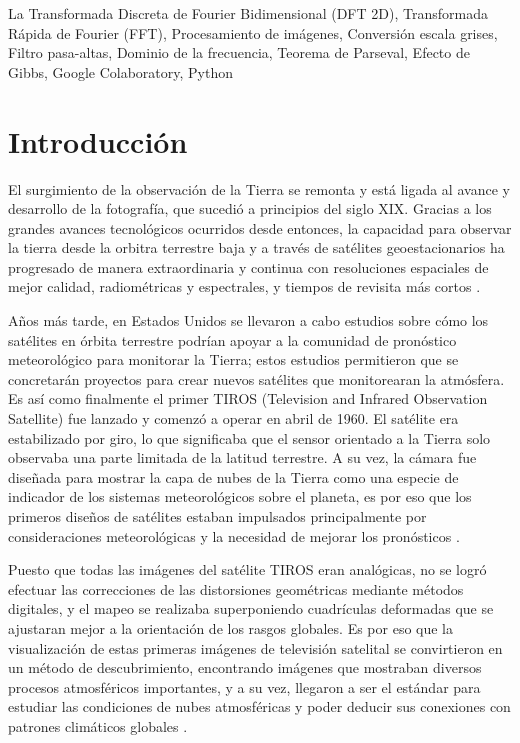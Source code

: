 \documentclass[conference]{IEEEtran}
\begin{document}
\vspace{0.5em}
\begin{IEEEkeywords}
La Transformada Discreta de Fourier Bidimensional
(DFT 2D), Transformada Rápida de Fourier (FFT), Procesamiento de imágenes, Conversión escala grises, Filtro pasa-altas, Dominio de la frecuencia, Teorema de Parseval, Efecto de Gibbs, Google Colaboratory, Python
\end{IEEEkeywords}

\section{Introducción}
El surgimiento de la observación de la Tierra se remonta y está ligada al avance y desarrollo de la fotografía, que sucedió a principios del siglo XIX. Gracias a los grandes avances tecnológicos ocurridos desde entonces, la capacidad para observar la tierra desde la orbitra terrestre baja y a través de satélites geoestacionarios ha progresado de manera extraordinaria y continua con resoluciones espaciales de mejor calidad, radiométricas y espectrales, y tiempos de revisita más cortos \cite{emery2017}.

Años más tarde, en Estados Unidos se llevaron a cabo estudios sobre cómo los satélites en órbita terrestre podrían apoyar a la comunidad de pronóstico meteorológico para monitorar la Tierra; estos estudios permitieron que se concretarán proyectos para crear nuevos satélites que monitorearan la atmósfera. Es así como finalmente el primer TIROS (Television and Infrared Observation Satellite) fue lanzado y comenzó a operar en abril de 1960. El satélite era estabilizado por giro, lo que significaba que el sensor orientado a la Tierra solo observaba una parte limitada de la latitud terrestre. A su vez, la cámara fue diseñada para mostrar la capa de nubes de la Tierra como una especie de indicador de los sistemas meteorológicos sobre el planeta, es por eso que los primeros diseños de satélites estaban impulsados principalmente por consideraciones meteorológicas y la necesidad de mejorar los pronósticos \cite{emery2017}.

Puesto que todas las imágenes del satélite TIROS eran analógicas, no se logró efectuar las correcciones de las distorsiones geométricas mediante métodos digitales, y el mapeo se realizaba superponiendo cuadrículas deformadas que se ajustaran mejor a la orientación de los rasgos globales. Es por eso que la visualización de estas primeras imágenes de televisión satelital se convirtieron en un método de descubrimiento, encontrando imágenes que mostraban diversos procesos atmosféricos importantes, y a su vez, llegaron a ser el estándar para estudiar las condiciones de nubes atmosféricas y poder deducir sus conexiones con patrones climáticos globales \cite{emery2017}.
\end{document}
